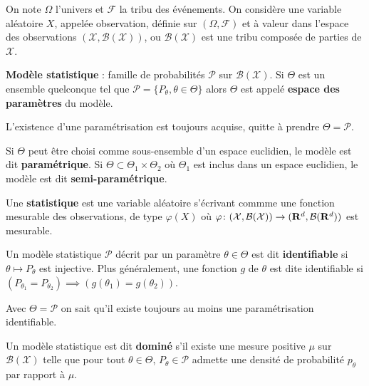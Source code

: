 On note $\Omega$ l'univers et $\mathcal{F}$ la tribu des événements.
On considère une variable aléatoire $X$, appelée observation, définie sur $(\Omega, \mathcal{F})$ et à valeur dans l'espace des observations $(\mathcal{X}, \mathcal{B}(\mathcal{X}))$, ou $\mathcal{B}(\mathcal{X})$ est une tribu composée de parties de $\mathcal{X}$.

\begin{defn}
	\textbf{Modèle statistique} : famille de probabilités $\mathcal{P}$ sur $\mathcal{B}(\mathcal{X})$.
	Si $\Theta$ est un ensemble quelconque tel que $\mathcal{P} = \{ P_\theta, \theta \in \Theta \}$ alors $\Theta$ est appelé \textbf{espace des paramètres} du modèle.
\end{defn}

\begin{rem}
	L'existence d'une paramétrisation est toujours acquise, quitte à prendre $\Theta = \mathcal{P}$.
\end{rem}

Si $\Theta$ peut être choisi comme sous-ensemble d'un espace euclidien, le modèle est dit \textbf{paramétrique}.
Si $\Theta \subset \Theta_1 \times \Theta_2$ où $\Theta_1$ est inclus dans un espace euclidien, le modèle est dit \textbf{semi-paramétrique}.

\begin{defn}
	Une \textbf{statistique} est une variable aléatoire s'écrivant commme une fonction mesurable des observations, de type $\varphi(X)$ où $\varphi \colon (\mathcal{X}, \mathcal{B}(\mathcal{X})) \to (\mathbf{R}^d, \mathcal{B}(\mathbf{R}^d))$ est mesurable.
\end{defn}

\begin{defn}[Identifiabilité]
	Un modèle statistique $\mathcal{P}$ décrit par un paramètre $\theta \in \Theta$ est dit \textbf{identifiable} si $\theta \mapsto P_\theta$ est injective.
	Plus généralement, une fonction $g$ de $\theta$ est dite identifiable si $\left( P_{\theta_1} = P_{\theta_2} \right) \implies \left( g(\theta_1) = g(\theta_2) \right)$.
\end{defn}

\begin{rem}
	Avec $\Theta = \mathcal{P}$ on sait qu'il existe toujours au moins une paramétrisation identifiable.
\end{rem}

\begin{defn}
	Un modèle statistique est dit \textbf{dominé} s'il existe une mesure positive $\mu$ sur $\mathcal{B}(\mathcal{X})$ telle que pour tout $\theta \in \Theta$, $P_\theta \in \mathcal{P}$ admette une densité de probabilité $p_\theta$ par rapport à $\mu$.
\end{defn}

